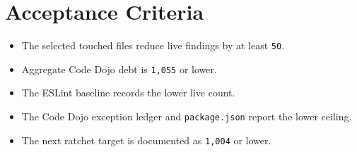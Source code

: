 \section{Acceptance Criteria}\label{record-234-acceptance-criteria}

\begin{itemize}
\tightlist
\item
  The selected touched files reduce live findings by at least \texttt{5\allowbreak{}0}.
\item
  Aggregate Code Dojo debt is \texttt{1\allowbreak{},\allowbreak{}0\allowbreak{}5\allowbreak{}5} or lower.
\item
  The ESLint baseline records the lower live count.
\item
  The Code Dojo exception ledger and \texttt{p\allowbreak{}a\allowbreak{}c\allowbreak{}k\allowbreak{}a\allowbreak{}g\allowbreak{}e\allowbreak{}.\allowbreak{}j\allowbreak{}s\allowbreak{}o\allowbreak{}n} report the lower ceiling.
\item
  The next ratchet target is documented as \texttt{1\allowbreak{},\allowbreak{}0\allowbreak{}0\allowbreak{}4} or lower.
\end{itemize}


